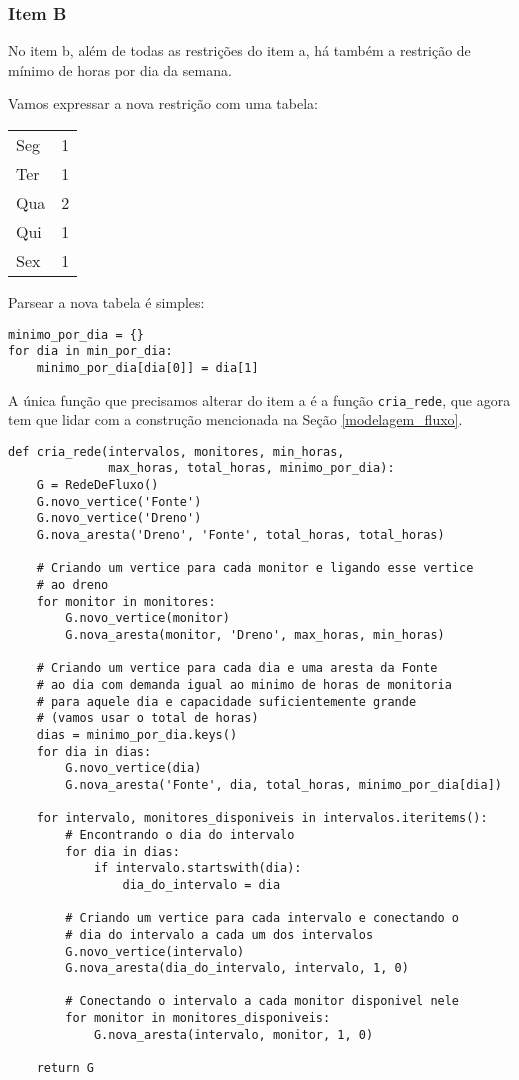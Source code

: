 \documentclass[11pt]{article}
\begin{document}
\subsubsection{Item B}
\label{sec-2-5-2}

No item b, além de todas as restrições do item a, há também a
restrição de mínimo de horas por dia da semana.

Vamos expressar a nova restrição com uma tabela:

\begin{center}
\begin{tabular}{lr}
Seg & 1\\
Ter & 1\\
Qua & 2\\
Qui & 1\\
Sex & 1\\
\end{tabular}
\end{center}

Parsear a nova tabela é simples:
\begin{verbatim}
minimo_por_dia = {}
for dia in min_por_dia:
    minimo_por_dia[dia[0]] = dia[1]
\end{verbatim}

A única função que precisamos alterar do item a é a função
\verb~cria_rede~, que agora tem que lidar com a construção mencionada na
Seção \ref{modelagem_fluxo}.

\begin{verbatim}
def cria_rede(intervalos, monitores, min_horas,
              max_horas, total_horas, minimo_por_dia):
    G = RedeDeFluxo()
    G.novo_vertice('Fonte')
    G.novo_vertice('Dreno')
    G.nova_aresta('Dreno', 'Fonte', total_horas, total_horas)

    # Criando um vertice para cada monitor e ligando esse vertice
    # ao dreno
    for monitor in monitores:
        G.novo_vertice(monitor)
        G.nova_aresta(monitor, 'Dreno', max_horas, min_horas)

    # Criando um vertice para cada dia e uma aresta da Fonte
    # ao dia com demanda igual ao minimo de horas de monitoria
    # para aquele dia e capacidade suficientemente grande
    # (vamos usar o total de horas)
    dias = minimo_por_dia.keys()
    for dia in dias:
        G.novo_vertice(dia)
        G.nova_aresta('Fonte', dia, total_horas, minimo_por_dia[dia])

    for intervalo, monitores_disponiveis in intervalos.iteritems():
        # Encontrando o dia do intervalo
        for dia in dias:
            if intervalo.startswith(dia):
                dia_do_intervalo = dia

        # Criando um vertice para cada intervalo e conectando o
        # dia do intervalo a cada um dos intervalos
        G.novo_vertice(intervalo)
        G.nova_aresta(dia_do_intervalo, intervalo, 1, 0)

        # Conectando o intervalo a cada monitor disponivel nele
        for monitor in monitores_disponiveis:
            G.nova_aresta(intervalo, monitor, 1, 0)

    return G
\end{verbatim}
\end{document}
